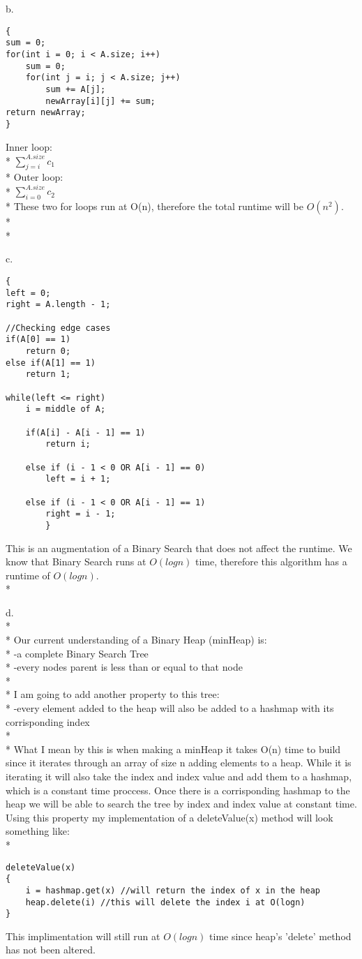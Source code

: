 \documentclass[11pt]{article}
\newcommand\tab[1][1cm]{\hspace*{#1}}
\begin{document}
\newpage
b.
\begin{lstlisting}
{
sum = 0;
for(int i = 0; i < A.size; i++)
	sum = 0;
	for(int j = i; j < A.size; j++)
		sum += A[j];
		newArray[i][j] += sum;
return newArray;
}
\end{lstlisting}
Inner loop:\\*
\tab $\sum_{j=i}^{A.size} c_1$\\*
Outer loop:\\*
\tab $\sum_{i = 0}^{A.size} c_2$\\*
These two for loops run at O(n), therefore the total runtime will be $O(n^2)$.\\*\\*



\newpage
c.
\begin{lstlisting}
{
left = 0;
right = A.length - 1;

//Checking edge cases
if(A[0] == 1)
	return 0;
else if(A[1] == 1)
	return 1;
	
while(left <= right)
	i = middle of A;
	
	if(A[i] - A[i - 1] == 1)
		return i;
		
	else if (i - 1 < 0 OR A[i - 1] == 0)
		left = i + 1;
		
	else if (i - 1 < 0 OR A[i - 1] == 1)
		right = i - 1;
		}
\end{lstlisting}
This is an augmentation of a Binary Search that does not affect the runtime.
We know that Binary Search runs at $O(logn)$ time, therefore this algorithm 
has a runtime of $O(logn)$.\\*



\newpage
d.\\*\\*
Our current understanding of a Binary Heap (minHeap) is:\\*
\tab -a complete Binary Search Tree\\*
\tab -every nodes parent is less than or equal to that node\\*\\*
I am going to add another property to this tree:\\*
\tab -every element added to the heap will also be added to a hashmap with its 
corrisponding index\\*\\*
What I mean by this is when making a minHeap it takes O(n) time to build since it
iterates through an array of size n adding elements to a heap. While it is iterating it 
will also take the index and index value and add them to a hashmap, which is a constant
time proccess. Once there is a corrisponding hashmap to the heap we will be able to 
search the tree by index and index value at constant time. Using this property my 
implementation of a deleteValue(x) method will look something like:\\*
\begin{lstlisting}
deleteValue(x)
{
	i = hashmap.get(x) //will return the index of x in the heap
	heap.delete(i) //this will delete the index i at O(logn)
}
\end{lstlisting}
This implimentation will still run at $O(logn)$ time since heap's 'delete' method 
has not been altered.
\end{document}
